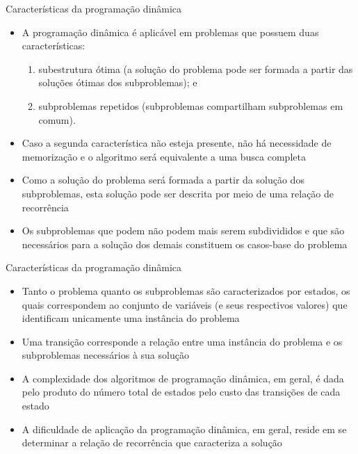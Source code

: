 \begin{frame}[fragile]{Características da programação dinâmica}

    \begin{itemize}
        \item A programação dinâmica é aplicável em problemas que possuem duas características:

        \begin{enumerate}
            \item subestrutura ótima (a solução do problema pode ser formada a partir das soluções
                ótimas dos subproblemas); e
            \item subproblemas repetidos (subproblemas compartilham subproblemas em comum).
        \end{enumerate}

        \item Caso a segunda característica não esteja presente, não há necessidade de memorização
            e o algoritmo será equivalente a uma busca completa

        \item Como a solução do problema será formada a partir da solução dos subproblemas, esta
            solução pode ser descrita por meio de uma relação de recorrência

        \item Os subproblemas que podem não podem mais serem subdivididos e que são necessários para
            a solução dos demais constituem os casos-base do problema
    \end{itemize}

\end{frame}

\begin{frame}[fragile]{Características da programação dinâmica}

    \begin{itemize}
        \item Tanto o problema quanto os subproblemas são caracterizados por estados, os quais
            correspondem ao conjunto de variáveis (e seus respectivos valores) que identificam
            unicamente uma instância do problema
        
        \item Uma transição corresponde a relação entre uma instância do problema e os 
            subproblemas necessários à sua solução

        \item A complexidade dos algoritmos de programação dinâmica, em geral, é dada pelo
            produto do número total de estados pelo custo das transições de cada estado

        \item A dificuldade de aplicação da programação dinâmica, em geral, reside em se determinar
            a relação de recorrência que caracteriza a solução
    \end{itemize}

\end{frame}

